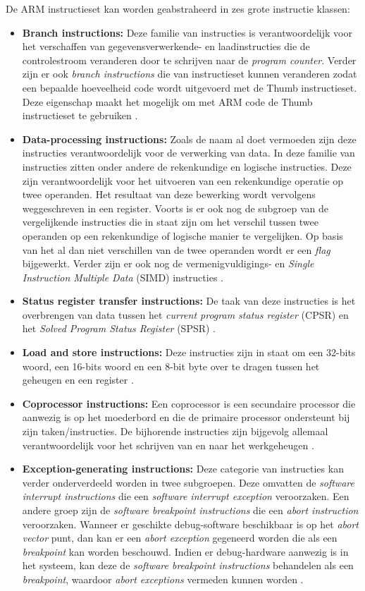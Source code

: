 De ARM instructieset kan worden geabstraheerd in zes grote instructie klassen:
\begin{itemize}
    \item \textbf{Branch instructions:} Deze familie van instructies is verantwoordelijk voor het verschaffen van gegevensverwerkende- en laadinstructies die de controlestroom veranderen door te schrijven naar de \textit{program counter}. Verder zijn er ook \textit{branch instructions} die van instructieset kunnen veranderen zodat een bepaalde hoeveelheid code wordt uitgevoerd met de Thumb instructieset. Deze eigenschap maakt het mogelijk om met ARM code de Thumb instructieset te gebruiken \autocite{Seal2000}.
    \item \textbf{Data-processing instructions:} Zoals de naam al doet vermoeden zijn deze instructies verantwoordelijk voor de verwerking van data. In deze familie van instructies zitten onder andere de rekenkundige en logische instructies. Deze zijn verantwoordelijk voor het uitvoeren van een rekenkundige operatie op twee operanden. Het resultaat van deze bewerking wordt vervolgens weggeschreven in een register. Voorts is er ook nog de subgroep van de vergelijkende instructies die in staat zijn om het verschil tussen twee operanden op een rekenkundige of logische manier te vergelijken. Op basis van het al dan niet verschillen van de twee operanden wordt er een \textit{flag} bijgewerkt. Verder zijn er ook nog de vermenigvuldigings- en \textit{Single Instruction Multiple Data} (SIMD) instructies \autocite{Seal2000}.
    \item \textbf{Status register transfer instructions:} De taak van deze instructies is het overbrengen van data tussen het \textit{current program status register} (CPSR) en het \textit{Solved Program Status Register} (SPSR) \autocite{ARM2022c}.
    \item \textbf{Load and store instructions:} Deze instructies zijn in staat om een 32-bits woord, een 16-bits woord en een 8-bit byte over te dragen tussen het geheugen en een register \autocite{ARM2022c}.
    \item \textbf{Coprocessor instructions:} Een coprocessor is een secundaire processor die aanwezig is op het moederbord en die de primaire processor ondersteunt bij zijn taken/instructies. De bijhorende instructies zijn bijgevolg allemaal verantwoordelijk voor het schrijven van en naar het werkgeheugen \autocite{ARM2022c}.
    \item \textbf{Exception-generating instructions:} Deze categorie van instructies kan verder onderverdeeld worden in twee subgroepen. Deze omvatten de \textit{software interrupt instructions} die een \textit{software interrupt exception} veroorzaken. Een andere groep zijn de \textit{software breakpoint instructions} die een \textit{abort instruction} veroorzaken. Wanneer er geschikte debug-software beschikbaar is op het \textit{abort vector} punt, dan kan er een \textit{abort exception} gegeneerd worden die als een \textit{breakpoint} kan worden beschouwd. Indien er debug-hardware aanwezig is in het systeem, kan deze de \textit{software breakpoint instructions} behandelen als een \textit{breakpoint}, waardoor \textit{abort exceptions} vermeden kunnen worden \autocite{Seal2000}.
\end{itemize}

